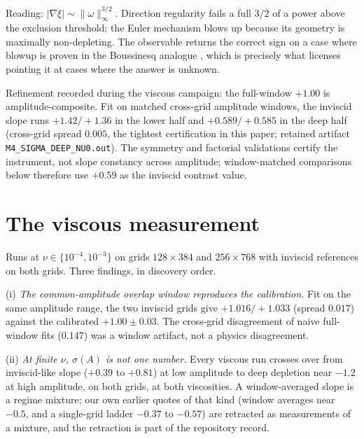 \documentclass[11pt]{article}
\newcommand{\om}{\omega}
\newcommand{\vinf}{\|\om\|_\infty}
\begin{document}
Reading: $|\nabla\xi|\sim\vinf^{3/2}$. Direction regularity fails a full
$3/2$ of a power above the exclusion threshold; the Euler mechanism blows
up because its geometry is maximally non-depleting. The observable returns
the correct sign on a case where blowup is proven in the Boussinesq
analogue \cite{CH22,CH25}, which is precisely what licenses pointing it at
cases where the answer is unknown.

Refinement recorded during the viscous campaign: the full-window $+1.00$
is amplitude-composite. Fit on matched cross-grid amplitude windows, the
inviscid slope runs $+1.42/+1.36$ in the lower half and $+0.589/+0.585$
in the deep half (cross-grid spread $0.005$, the tightest certification in
this paper; retained artifact \texttt{M4\_SIGMA\_DEEP\_NU0.out}). The symmetry and factorial validations certify the instrument, not
slope constancy across amplitude; window-matched comparisons below
therefore use $+0.59$ as the inviscid contrast value.

\section{The viscous measurement}\label{sec:viscous}

Runs at $\nu\in\{10^{-4},10^{-3}\}$ on grids $128\times384$ and
$256\times768$ with inviscid references on both grids. Three findings, in
discovery order.

(i) \emph{The common-amplitude overlap window reproduces the calibration.}
Fit on the same amplitude range, the two inviscid grids give
$+1.016/+1.033$ (spread $0.017$) against the calibrated $+1.00\pm0.03$.
The cross-grid disagreement of naive full-window fits ($0.147$) was a
window artifact, not a physics disagreement.

(ii) \emph{At finite $\nu$, $\sigma(A)$ is not one number.} Every viscous
run crosses over from inviscid-like slope ($+0.39$ to $+0.81$) at low
amplitude to deep depletion near $-1.2$ at high amplitude, on both grids,
at both viscosities. A window-averaged slope is a regime mixture; our own
earlier quotes of that kind (window averages near $-0.5$, and a
single-grid ladder $-0.37$ to $-0.57$) are retracted as measurements of a
mixture, and the retraction is part of the repository record.
\end{document}
